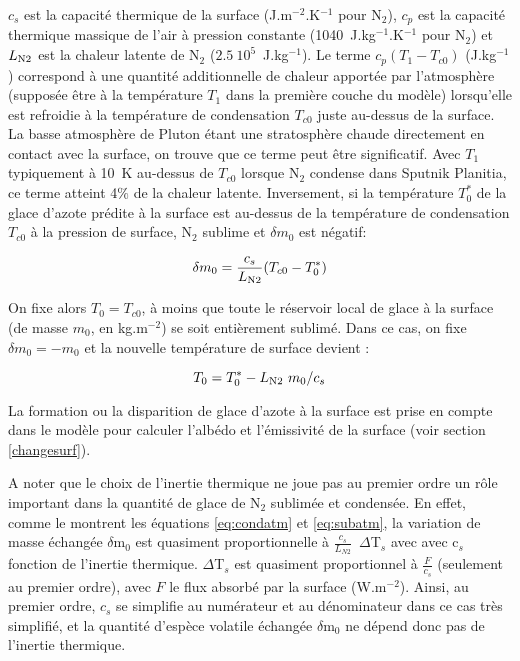 $c_s$ est la capacité thermique de la surface (J.m$^{-2}$.K$^{-1}$ pour N$_2$), $c_p$  est la capacité thermique massique de l’air à pression constante (1040~J.kg$^{-1}$.K$^{-1}$ pour N$_2$) et $L_{\mbox{\scriptsize N2}} $ est la chaleur latente de N$_2$ ($2.5~10^5$~J.kg$^{-1}$). 
Le terme $c_p(T_1 -T_{c0})$ (J.kg$^{-1}$) correspond à une quantité additionnelle de chaleur apportée par l’atmosphère (supposée être à la température $T_1$ dans la première couche du modèle) lorsqu’elle est refroidie à la température de condensation $T_{c0}$ juste au-dessus de la surface. La basse atmosphère de Pluton étant une stratosphère chaude directement en contact avec la surface, on trouve que ce terme peut être significatif. Avec $T_1$ typiquement à 10~K au-dessus de $T_{c0}$ lorsque N$_2$ condense dans Sputnik Planitia, ce terme atteint 4$\%$ de la chaleur latente. 
Inversement, si la température $T^*_0$ de la glace d’azote prédite à la surface est au-dessus de la température de condensation $T_{c0}$ à la pression de surface, N$_2$ sublime et $\delta m_0$ est négatif:

\begin{equation}
\label{eq:subatm}
\delta m_0 = \frac{c_s}{L_{\mbox{\scriptsize N2}} } (T_{c0} - T^*_0) 
\end{equation}

On fixe alors $T_0 = T_{c0}$, à moins que toute le réservoir local de glace à la surface (de masse $m_0$, en kg.m$^{-2}$) se soit entièrement sublimé. Dans ce cas, on fixe $\delta m_0 = -m_0$ et la nouvelle température de surface devient :

\begin{equation}
T_0 = T^*_0 - L_{\mbox{\scriptsize N2}}  \ m_0 / c_s 
\end{equation}

La formation ou la disparition de glace d’azote à la surface est prise en compte dans le modèle pour calculer l’albédo et l’émissivité de la surface (voir section \ref{changesurf}).

A noter que le choix de l’inertie thermique ne joue pas au premier ordre un rôle important dans la quantité de glace de N$_2$ sublimée et condensée. En effet, comme le montrent les équations \ref{eq:condatm} et \ref{eq:subatm}, la variation de masse échangée $\delta$m$_0$ est quasiment proportionnelle à $\frac{c_s}{L_{N2}}$~$\Delta$T$_s$ avec avec c$_s$ fonction de l'inertie thermique. $\Delta$T$_s$ est quasiment proportionnel à $\frac{F}{c_s}$ (seulement au premier ordre), avec $F$ le flux absorbé par la surface (W.m$^{-2}$). Ainsi, au premier ordre, $c_s$ se simplifie au numérateur et au dénominateur dans ce cas très simplifié, et la quantité d'espèce volatile échangée $\delta$m$_0$ ne dépend donc pas de l’inertie thermique.  

